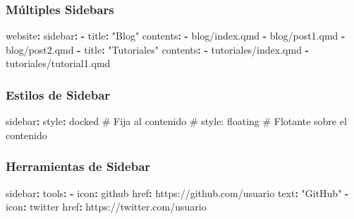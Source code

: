 \documentclass[
  doc,
  floatsintext,
  longtable,
  a4paper,
  nolmodern,
  notxfonts,
  notimes,
  12pt,
  colorlinks=true,linkcolor=blue,citecolor=blue,urlcolor=blue]{apa7}
\newenvironment{Shaded}{\begin{snugshade}}{\end{snugshade}}
\newcommand{\AttributeTok}[1]{\textcolor[rgb]{0.40,0.45,0.13}{#1}}
\newcommand{\CommentTok}[1]{\textcolor[rgb]{0.37,0.37,0.37}{#1}}
\newcommand{\FunctionTok}[1]{\textcolor[rgb]{0.28,0.35,0.67}{#1}}
\newcommand{\KeywordTok}[1]{\textcolor[rgb]{0.00,0.23,0.31}{\textbf{#1}}}
\newcommand{\StringTok}[1]{\textcolor[rgb]{0.13,0.47,0.30}{#1}}
\begin{document}
\subsubsection{Múltiples Sidebars}\label{muxfaltiples-sidebars}

\begin{Shaded}
\begin{Highlighting}[]
\FunctionTok{website}\KeywordTok{:}
\AttributeTok{  }\FunctionTok{sidebar}\KeywordTok{:}
\AttributeTok{    }\KeywordTok{{-}}\AttributeTok{ }\FunctionTok{title}\KeywordTok{:}\AttributeTok{ }\StringTok{"Blog"}
\AttributeTok{      }\FunctionTok{contents}\KeywordTok{:}
\AttributeTok{        }\KeywordTok{{-}}\AttributeTok{ blog/index.qmd}
\AttributeTok{        }\KeywordTok{{-}}\AttributeTok{ blog/post1.qmd}
\AttributeTok{        }\KeywordTok{{-}}\AttributeTok{ blog/post2.qmd}
\AttributeTok{        }
\AttributeTok{    }\KeywordTok{{-}}\AttributeTok{ }\FunctionTok{title}\KeywordTok{:}\AttributeTok{ }\StringTok{"Tutoriales"}
\AttributeTok{      }\FunctionTok{contents}\KeywordTok{:}
\AttributeTok{        }\KeywordTok{{-}}\AttributeTok{ tutoriales/index.qmd}
\AttributeTok{        }\KeywordTok{{-}}\AttributeTok{ tutoriales/tutorial1.qmd}
\end{Highlighting}
\end{Shaded}

\subsubsection{Estilos de Sidebar}\label{estilos-de-sidebar}

\begin{Shaded}
\begin{Highlighting}[]
\FunctionTok{sidebar}\KeywordTok{:}
\AttributeTok{  }\FunctionTok{style}\KeywordTok{:}\AttributeTok{ docked}\CommentTok{                      \# Fija al contenido}
\CommentTok{  \# style: floating                  \# Flotante sobre el contenido}
\end{Highlighting}
\end{Shaded}

\subsubsection{Herramientas de Sidebar}\label{herramientas-de-sidebar}

\begin{Shaded}
\begin{Highlighting}[]
\FunctionTok{sidebar}\KeywordTok{:}
\AttributeTok{  }\FunctionTok{tools}\KeywordTok{:}
\AttributeTok{    }\KeywordTok{{-}}\AttributeTok{ }\FunctionTok{icon}\KeywordTok{:}\AttributeTok{ github}
\AttributeTok{      }\FunctionTok{href}\KeywordTok{:}\AttributeTok{ https://github.com/usuario}
\AttributeTok{      }\FunctionTok{text}\KeywordTok{:}\AttributeTok{ }\StringTok{"GitHub"}
\AttributeTok{    }\KeywordTok{{-}}\AttributeTok{ }\FunctionTok{icon}\KeywordTok{:}\AttributeTok{ twitter}
\AttributeTok{      }\FunctionTok{href}\KeywordTok{:}\AttributeTok{ https://twitter.com/usuario}
\end{Highlighting}
\end{Shaded}
\end{document}
